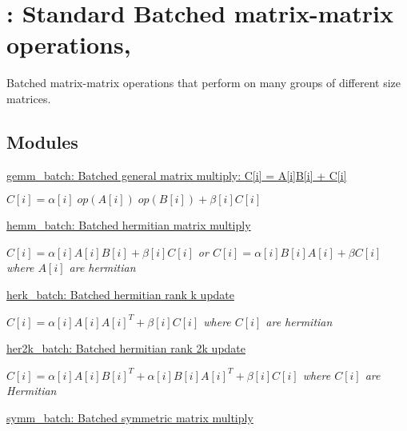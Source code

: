 \hypertarget{group__group__blas3}{}\section{\+: Standard Batched matrix-\/matrix operations,}
\label{group__group__blas3}


Batched matrix-\/matrix operations that perform on many groups of different size matrices.  


\subsection*{Modules}
\begin{DoxyCompactItemize}
\item 
\hyperlink{group__gemm__batch}{gemm\+\_\+batch\+:  Batched general matrix multiply\+: C\mbox{[}i\mbox{]} = A\mbox{[}i\mbox{]}\+B\mbox{[}i\mbox{]} + C\mbox{[}i\mbox{]}}
\begin{DoxyCompactList}\small\item\em $ C[i] = \alpha[i] \;op(A[i]) \;op(B[i]) + \beta[i] C[i] $ \end{DoxyCompactList}\item 
\hyperlink{group__hemm__batch}{hemm\+\_\+batch\+: Batched hermitian matrix multiply}
\begin{DoxyCompactList}\small\item\em $ C[i] = \alpha[i] A[i] B[i] + \beta[i] C[i] $ or $ C[i] = \alpha[i] B[i] A[i] + \beta C[i] $ where $ A[i] $ are hermitian \end{DoxyCompactList}\item 
\hyperlink{group__herk__batch}{herk\+\_\+batch\+:  Batched hermitian rank k update}
\begin{DoxyCompactList}\small\item\em $ C[i] = \alpha[i] A[i] A[i]^T + \beta[i] C[i] $ where $ C[i] $ are hermitian \end{DoxyCompactList}\item 
\hyperlink{group__her2k__batch}{her2k\+\_\+batch\+: Batched hermitian rank 2k update}
\begin{DoxyCompactList}\small\item\em $ C[i] = \alpha[i] A[i] B[i]^T + \alpha[i] B[i] A[i]^T + \beta[i] C[i] $ where $ C[i] $ are Hermitian \end{DoxyCompactList}\item 
\hyperlink{group__symm__batch}{symm\+\_\+batch\+:  Batched symmetric matrix multiply}

\end{DoxyCompactItemize}
